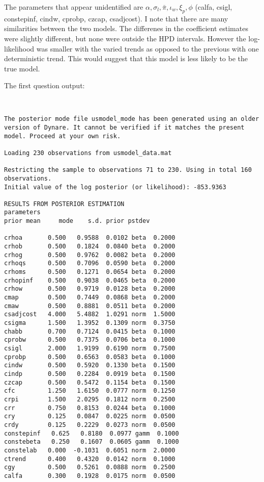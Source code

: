 \documentclass[]{article}
\begin{document}
\begin{enumerate}
\begin{enumerate}
	The parameters that appear unidentified are $ \alpha, \sigma_l,  \bar{\pi}, \iota_w, \xi_p, \phi  $ (calfa, csigl, constepinf, cindw, cprobp, czcap, csadjcost). I note that there are many similarities between the two models. The differenes in the coefficient estimates were slightly different, but none were outside the HPD intervals. However the log-likelihood was smaller with the varied trends as opposed to the previous with one deterministic trend. This would suggest that this model is less likely to be the true model. 
\end{enumerate}
\end{enumerate}


The first question output:
\begin{verbatim}


The posterior mode file usmodel_mode has been generated using an older version of Dynare. It cannot be verified if it matches the present model. Proceed at your own risk.

Loading 230 observations from usmodel_data.mat

Restricting the sample to observations 71 to 230. Using in total 160 observations. 
Initial value of the log posterior (or likelihood): -853.9363

RESULTS FROM POSTERIOR ESTIMATION
parameters
prior mean     mode    s.d. prior pstdev

crhoa       0.500   0.9588  0.0102 beta  0.2000 
crhob       0.500   0.1824  0.0840 beta  0.2000 
crhog       0.500   0.9762  0.0082 beta  0.2000 
crhoqs      0.500   0.7096  0.0590 beta  0.2000 
crhoms      0.500   0.1271  0.0654 beta  0.2000 
crhopinf    0.500   0.9038  0.0465 beta  0.2000 
crhow       0.500   0.9719  0.0128 beta  0.2000 
cmap        0.500   0.7449  0.0868 beta  0.2000 
cmaw        0.500   0.8881  0.0511 beta  0.2000 
csadjcost   4.000   5.4882  1.0291 norm  1.5000 
csigma      1.500   1.3952  0.1309 norm  0.3750 
chabb       0.700   0.7124  0.0415 beta  0.1000 
cprobw      0.500   0.7375  0.0706 beta  0.1000 
csigl       2.000   1.9199  0.6190 norm  0.7500 
cprobp      0.500   0.6563  0.0583 beta  0.1000 
cindw       0.500   0.5920  0.1330 beta  0.1500 
cindp       0.500   0.2284  0.0919 beta  0.1500 
czcap       0.500   0.5472  0.1154 beta  0.1500 
cfc         1.250   1.6150  0.0777 norm  0.1250 
crpi        1.500   2.0295  0.1812 norm  0.2500 
crr         0.750   0.8153  0.0244 beta  0.1000 
cry         0.125   0.0847  0.0225 norm  0.0500 
crdy        0.125   0.2229  0.0273 norm  0.0500 
constepinf   0.625   0.8180  0.0977 gamm  0.1000 
constebeta   0.250   0.1607  0.0605 gamm  0.1000 
constelab   0.000  -0.1031  0.6051 norm  2.0000 
ctrend      0.400   0.4320  0.0142 norm  0.1000 
cgy         0.500   0.5261  0.0888 norm  0.2500 
calfa       0.300   0.1928  0.0175 norm  0.0500 


\end{verbatim}
\end{document}
